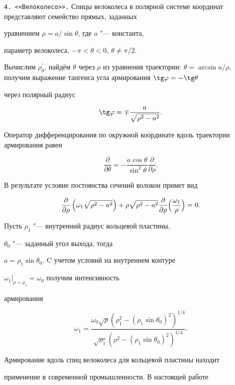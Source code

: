 {\tt 4.  <<Велоколесо>>.} Спицы велоколеса в полярной системе координат представляют семейство прямых, заданных

уравнением $\rho={a}/{\sin \theta} $, где $a$ "--- константа,

параметр велоколеса, $-\pi<\theta<0$, $\theta\neq {\pi}/{2}$.

Вычислим $\rho^{\prime}_\theta$, найдём $\theta$ через $\rho$  из уравнения траектории: $\theta=\arcsin {a}/{\rho},$ получим выражение тангенса угла армирования $\tg \varphi =- \tg \theta$

через полярный радиус

 $$\tg \varphi=\mp\dfrac{a}{\sqrt{\rho^2-a^2}}.$$

 Оператор дифференцирования по окружной координате вдоль траектории армирования равен

 $$\dfrac{\partial}{\partial\theta}=-\dfrac{a\cos\theta}{\sin^2\theta}\dfrac{\partial}{\partial \rho}.$$

   В результате условие постоянства сечений волокон примет вид

\begin{equation}

\label{eq:nemfed:Spiz}

\dfrac{\partial}{\partial\rho}\left(\omega_1\sqrt{\rho^2-a^2}

\right)+ \rho

\sqrt{\rho^2-a^2}\dfrac{\partial}{\partial\rho}\Bigl(\dfrac{\omega_1}{\rho}\Bigr)=0.

\end{equation}

Пусть $\rho_1$ "--- внутренний радиус кольцевой пластины,

$\theta_0$ "--- заданный угол выхода, тогда

$a=\rho_1\sin\theta_0$. C учетом условий на внутреннем контуре

$\omega_1\big|_{\rho=\rho_1}=\omega_0$ получим интенсивность

армирования

$$

\omega_1=\dfrac{\omega_0\sqrt{\rho}(\rho_1^2-(\rho_1\sin\theta_0)^2)^{1/4}}

{\sqrt{\rho_1}(\rho^2-(\rho_1\sin\theta_0)^2)^{1/4}}.

$$



Армирование вдоль спиц велоколеса для кольцевой пластины находит

применение в современной промышленности. В настоящей работе

